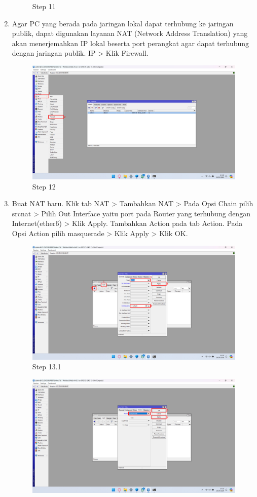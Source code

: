 \begin{center}
\begin{enumerate}
\begin{figure}[H]
			\caption{Step 11}
			\label{fig:Step 11}
		\end{figure}
        \item Agar PC yang berada pada jaringan lokal dapat terhubung ke jaringan publik, dapat digunakan layanan NAT (Network Address Translation) yang akan menerjemahkan IP lokal beserta port perangkat agar dapat terhubung dengan jaringan publik. IP > Klik Firewall.
        \begin{figure}[H]
			\centering
			\includegraphics[width=0.8\linewidth]{P3/img/Step 12.png}
			\caption{Step 12}
			\label{fig:Step 12}
		\end{figure}
        \item Buat NAT baru. Klik tab NAT > Tambahkan NAT > Pada Opsi Chain pilih srcnat > Pilih Out Interface yaitu port pada Router yang terhubung dengan Internet(ether6) > Klik Apply. Tambahkan Action pada tab Action. Pada Opsi Action pilih masquerade > Klik Apply > Klik OK.
        \begin{figure}[H]
			\centering
			\includegraphics[width=0.8\linewidth]{P3/img/Step 13.png}
			\caption{Step 13.1}
			\label{fig:Step 13.1}
		\end{figure}
        \begin{figure}[H]
			\centering
			\includegraphics[width=0.8\linewidth]{P3/img/Step 14.png}

\end{figure}
\end{enumerate}
\end{center}
